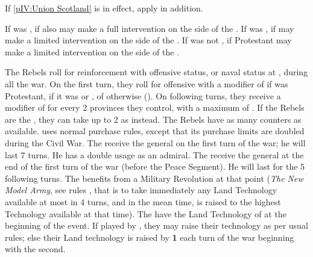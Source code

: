 \aparag If \ref{pIV:Union Scotland} is in effect, apply  in addition.

\phdipl
\aparag If \ENG was \CATHCR, \SPA if also \CATHCR may make a full intervention
on the side of the \royal.
\aparag If \ENG was \PROTANG, \SPA if \CATHCR may make a limited intervention
on the side of the \royal.
\aparag If \ENG was not \CATHCR, \HOL if Protestant may make a limited
intervention on the side of the \parl.

\phadm
\aparag[Reinforcements]
\bparag The Rebels roll for reinforcement with offensive status, or naval
status at , during all the war. On the first turn, they roll for
offensive with a modifier of  if \ENG was Protestant,  if
it was \CATHCR or \PROTANG, of  otherwise (\CATHCO).
\bparag On following turns, they receive a modifier of  for every 2
provinces they control, with a maximum of .
\bparag If the Rebels are the \parl, they can take up to 2 \LD as \ND instead.
\bparag The Rebels have as many counters as \ENG available.
\aparag \ENG uses normal purchase rules, except that its purchase limits are
doubled during the Civil War.
\aparag The \royal receive the general  on the first
turn of the war; he will last 7 turns. He has a double usage as an admiral.
\aparag The \parl receive the general  at the end of
the first turn of the war (before the Peace Segment).  He will last for the 5
following turns. The \parl benefits from a Military Revolution at that point
(\textit{The New Model Army}, see rules , that is to take immediately any Land Technology available at
most in 4 turns, and in the mean time, is raised to the highest Technology
available at that time).
\aparag The \royal have the Land Technology of \ENG at the beginning of the
event. If played by \ENG, they may raise their technology as per usual rules;
else their Land technology is raised by {\bf 1} each turn of the war beginning
with the second.

